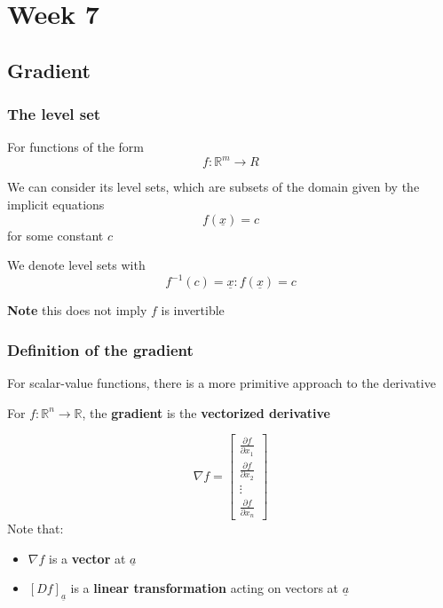 \chapter{Week 7}

\section{Gradient}

\subsection{The level set}

\begin{framed}
   For functions of the form \[
     f: \mathbb{R}^m \rightarrow R
   \] 

   We can consider its level sets, which are subsets of the domain given by the implicit equations
   \[
     f( \underline{x}) = c
   \] for some constant $c$

   We denote level sets with
   \[
      f^{-1} (c) = { \underline{x} : f( \underline{x}) = c}
   \] 

   \textbf{Note} this does not imply $f$ is invertible
\end{framed}

\subsection{Definition of the gradient}

For scalar-value functions, there is a more primitive approach to the derivative

\begin{framed}
   For $ f: \mathbb{R}^n \rightarrow \mathbb{R}$, the \textbf{gradient} is the \textbf{vectorized derivative}

   \[
     \nabla f = \begin{bmatrix} 
        \frac{\partial f}{\partial x_1} \\
        \frac{\partial f}{\partial x_2} \\
        \vdots \\
        \frac{\partial f}{\partial x_n}
     \end{bmatrix}
   \] 
   Note that: 
   \begin{itemize}
      \item $\nabla f$ is a \textbf{vector} at $\underline{a}$
      \item $ \left[ D f \right]_{ \underline{a}} $ is a \textbf{linear transformation} acting on vectors at $\underline{a}$
   \end{itemize}
\end{framed}

